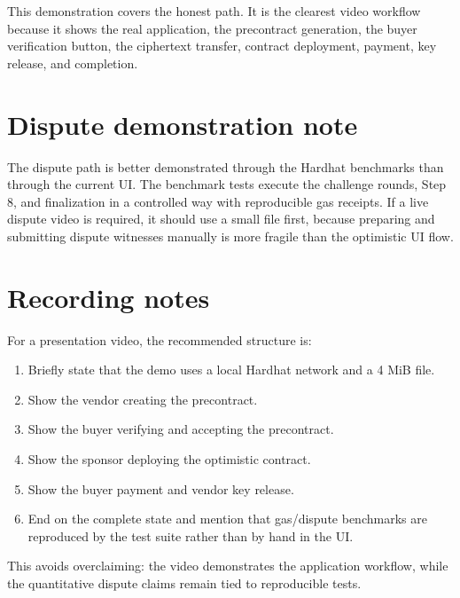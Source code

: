 This demonstration covers the honest path. It is the clearest video workflow because it
shows the real application, the precontract generation, the buyer verification button, the
ciphertext transfer, contract deployment, payment, key release, and completion.

\section{Dispute demonstration note}

The dispute path is better demonstrated through the Hardhat benchmarks than through the
current UI. The benchmark tests execute the challenge rounds, Step 8, and finalization in a
controlled way with reproducible gas receipts. If a live dispute video is required, it
should use a small file first, because preparing and submitting dispute witnesses manually
is more fragile than the optimistic UI flow.

\section{Recording notes}

For a presentation video, the recommended structure is:

\begin{enumerate}
  \item Briefly state that the demo uses a local Hardhat network and a 4 MiB file.
  \item Show the vendor creating the precontract.
  \item Show the buyer verifying and accepting the precontract.
  \item Show the sponsor deploying the optimistic contract.
  \item Show the buyer payment and vendor key release.
  \item End on the complete state and mention that gas/dispute benchmarks are reproduced
  by the test suite rather than by hand in the UI.
\end{enumerate}

This avoids overclaiming: the video demonstrates the application workflow, while the
quantitative dispute claims remain tied to reproducible tests.
